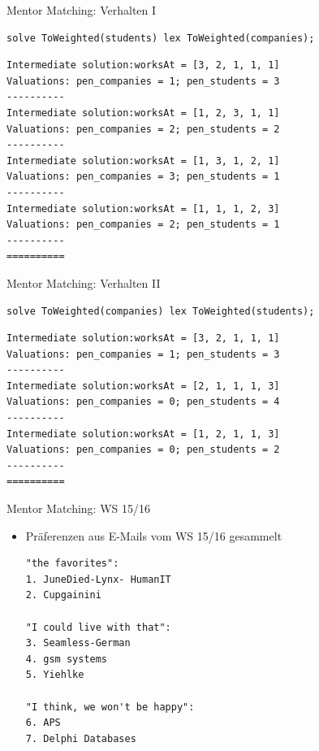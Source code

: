 \documentclass[handout,10pt,xcolor={dvipsnames},fleqn]{beamer}
\begin{document}
\begin{frame}[fragile]{Mentor Matching: Verhalten I}
\begin{lstlisting}
solve ToWeighted(students) lex ToWeighted(companies);
\end{lstlisting}
\begin{Verbatim}[fontsize=\small]
Intermediate solution:worksAt = [3, 2, 1, 1, 1]
Valuations: pen_companies = 1; pen_students = 3
----------
Intermediate solution:worksAt = [1, 2, 3, 1, 1]
Valuations: pen_companies = 2; pen_students = 2
----------
Intermediate solution:worksAt = [1, 3, 1, 2, 1]
Valuations: pen_companies = 3; pen_students = 1
----------
Intermediate solution:worksAt = [1, 1, 1, 2, 3]
Valuations: pen_companies = 2; pen_students = 1
----------
==========
\end{Verbatim}

\end{frame}

\begin{frame}[fragile]{Mentor Matching: Verhalten II}
\begin{lstlisting}
solve ToWeighted(companies) lex ToWeighted(students);
\end{lstlisting}
\begin{Verbatim}[fontsize=\small]
Intermediate solution:worksAt = [3, 2, 1, 1, 1]
Valuations: pen_companies = 1; pen_students = 3
----------
Intermediate solution:worksAt = [2, 1, 1, 1, 3]
Valuations: pen_companies = 0; pen_students = 4
----------
Intermediate solution:worksAt = [1, 2, 1, 1, 3]
Valuations: pen_companies = 0; pen_students = 2
----------
==========
\end{Verbatim}

\end{frame}


\begin{frame}[fragile]{Mentor Matching: WS 15/16}
\begin{itemize}
\item Präferenzen aus E-Mails vom WS 15/16 gesammelt

\begin{parchment}
\begin{verbatim}
"the favorites":
1. JuneDied-Lynx- HumanIT
2. Cupgainini
 
"I could live with that":
3. Seamless-German
4. gsm systems
5. Yiehlke
 
"I think, we won't be happy":
6. APS
7. Delphi Databases
\end{verbatim} 
\end{parchment}
\end{itemize}
\end{frame}
\end{document}
